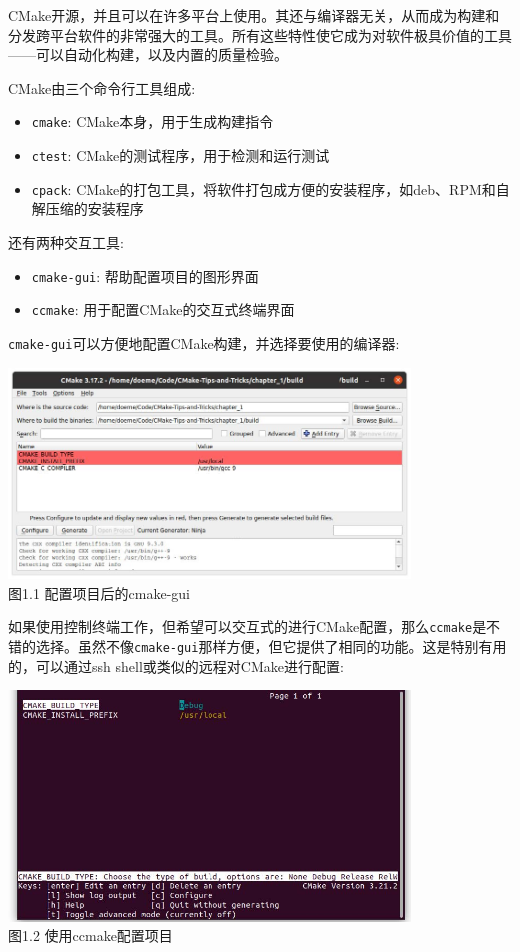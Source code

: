 CMake开源，并且可以在许多平台上使用。其还与编译器无关，从而成为构建和分发跨平台软件的非常强大的工具。所有这些特性使它成为对软件极具价值的工具——可以自动化构建，以及内置的质量检验。

CMake由三个命令行工具组成:

\begin{itemize}
\item 
\texttt{cmake}: CMake本身，用于生成构建指令

\item 
\texttt{ctest}: CMake的测试程序，用于检测和运行测试

\item 
\texttt{cpack}: CMake的打包工具，将软件打包成方便的安装程序，如deb、RPM和自解压缩的安装程序
\end{itemize}

还有两种交互工具:

\begin{itemize}
\item 
\texttt{cmake-gui}: 帮助配置项目的图形界面

\item 
\texttt{ccmake}: 用于配置CMake的交互式终端界面
\end{itemize}

\texttt{cmake-gui}可以方便地配置CMake构建，并选择要使用的编译器:

\begin{center}
\includegraphics[width=0.8\textwidth]{content/1/chapter1/images/1.jpg}\\
图1.1  配置项目后的cmake-gui
\end{center}

如果使用控制终端工作，但希望可以交互式的进行CMake配置，那么\texttt{ccmake}是不错的选择。虽然不像\texttt{cmake-gui}那样方便，但它提供了相同的功能。这是特别有用的，可以通过ssh shell或类似的远程对CMake进行配置:

\begin{center}
\includegraphics[width=0.8\textwidth]{content/1/chapter1/images/2.jpg}\\
图1.2  使用ccmake配置项目
\end{center}

